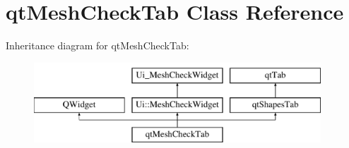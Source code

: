 \hypertarget{classqt_mesh_check_tab}{}\section{qt\+Mesh\+Check\+Tab Class Reference}
\label{classqt_mesh_check_tab}
Inheritance diagram for qt\+Mesh\+Check\+Tab\+:\begin{figure}[H]
\begin{center}
\leavevmode
\includegraphics[height=3.000000cm]{classqt_mesh_check_tab}
\end{center}
\end{figure}
